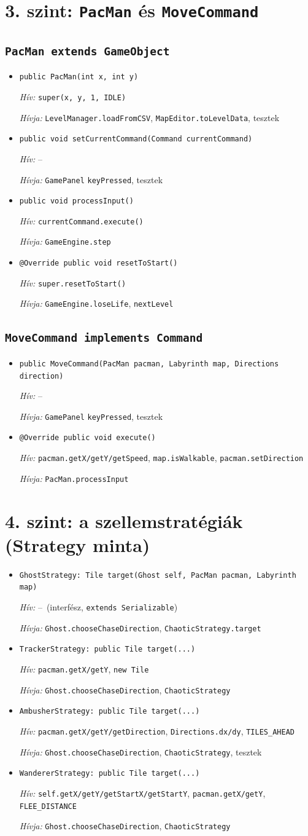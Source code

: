 \documentclass[10pt, a4paper]{article}
\newcommand{\fn}[3]{%
  \item \texttt{#1}\par
  {\small\textit{Hív:} #2\par\textit{Hívja:} #3}\vspace{3pt}}
\newcommand{\none}{--}
\begin{document}
\section{3. szint: \texttt{PacMan} és \texttt{MoveCommand}}
\subsection*{\texttt{PacMan extends GameObject}}
\begin{itemize}
\fn{public PacMan(int x, int y)}{\texttt{super(x, y, 1, IDLE)}}{\texttt{LevelManager.loadFromCSV}, \texttt{MapEditor.toLevelData}, tesztek}
\fn{public void setCurrentCommand(Command currentCommand)}{\none}{\texttt{GamePanel} \texttt{keyPressed}, tesztek}
\fn{public void processInput()}{\texttt{currentCommand.execute()}}{\texttt{GameEngine.step}}
\fn{@Override public void resetToStart()}{\texttt{super.resetToStart()}}{\texttt{GameEngine.loseLife}, \texttt{nextLevel}}
\end{itemize}

\subsection*{\texttt{MoveCommand implements Command}}
\begin{itemize}
\fn{public MoveCommand(PacMan pacman, Labyrinth map, Directions direction)}{\none}{\texttt{GamePanel} \texttt{keyPressed}, tesztek}
\fn{@Override public void execute()}{\texttt{pacman.getX/getY/getSpeed}, \texttt{map.isWalkable}, \texttt{pacman.setDirection}}{\texttt{PacMan.processInput}}
\end{itemize}

\section{4. szint: a szellemstratégiák (Strategy minta)}
\begin{itemize}
\fn{GhostStrategy: Tile target(Ghost self, PacMan pacman, Labyrinth map)}{\none\ (interfész, \texttt{extends Serializable})}{\texttt{Ghost.chooseChaseDirection}, \texttt{ChaoticStrategy.target}}
\fn{TrackerStrategy: public Tile target(...)}{\texttt{pacman.getX/getY}, \texttt{new Tile}}{\texttt{Ghost.chooseChaseDirection}, \texttt{ChaoticStrategy}}
\fn{AmbusherStrategy: public Tile target(...)}{\texttt{pacman.getX/getY/getDirection}, \texttt{Directions.dx/dy}, \texttt{TILES\_AHEAD}}{\texttt{Ghost.chooseChaseDirection}, \texttt{ChaoticStrategy}, tesztek}
\fn{WandererStrategy: public Tile target(...)}{\texttt{self.getX/getY/getStartX/getStartY}, \texttt{pacman.getX/getY}, \texttt{FLEE\_DISTANCE}}{\texttt{Ghost.chooseChaseDirection}, \texttt{ChaoticStrategy}}
\end{itemize}
\end{document}

